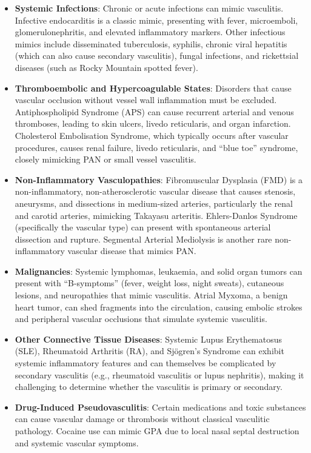 \begin{itemize}
\item \textbf{Systemic Infections}: Chronic or acute infections can mimic vasculitis. Infective endocarditis is a classic mimic, presenting with fever, microemboli, glomerulonephritis, and elevated inflammatory markers. Other infectious mimics include disseminated tuberculosis, syphilis, chronic viral hepatitis (which can also cause secondary vasculitis), fungal infections, and rickettsial diseases (such as Rocky Mountain spotted fever).
\item \textbf{Thromboembolic and Hypercoagulable States}: Disorders that cause vascular occlusion without vessel wall inflammation must be excluded. Antiphospholipid Syndrome (APS) can cause recurrent arterial and venous thromboses, leading to skin ulcers, livedo reticularis, and organ infarction. Cholesterol Embolisation Syndrome, which typically occurs after vascular procedures, causes renal failure, livedo reticularis, and ``blue toe'' syndrome, closely mimicking PAN or small vessel vasculitis.
\item \textbf{Non-Inflammatory Vasculopathies}: Fibromuscular Dysplasia (FMD) is a non-inflammatory, non-atherosclerotic vascular disease that causes stenosis, aneurysms, and dissections in medium-sized arteries, particularly the renal and carotid arteries, mimicking Takayasu arteritis. Ehlers-Danlos Syndrome (specifically the vascular type) can present with spontaneous arterial dissection and rupture. Segmental Arterial Mediolysis is another rare non-inflammatory vascular disease that mimics PAN.
\item \textbf{Malignancies}: Systemic lymphomas, leukaemia, and solid organ tumors can present with ``B-symptoms'' (fever, weight loss, night sweats), cutaneous lesions, and neuropathies that mimic vasculitis. Atrial Myxoma, a benign heart tumor, can shed fragments into the circulation, causing embolic strokes and peripheral vascular occlusions that simulate systemic vasculitis.
\item \textbf{Other Connective Tissue Diseases}: Systemic Lupus Erythematosus (SLE), Rheumatoid Arthritis (RA), and Sj\"{o}gren's Syndrome can exhibit systemic inflammatory features and can themselves be complicated by secondary vasculitis (e.g., rheumatoid vasculitis or lupus nephritis), making it challenging to determine whether the vasculitis is primary or secondary.
\item \textbf{Drug-Induced Pseudovasculitis}: Certain medications and toxic substances can cause vascular damage or thrombosis without classical vasculitic pathology. Cocaine use can mimic GPA due to local nasal septal destruction and systemic vascular symptoms.
\end{itemize}

